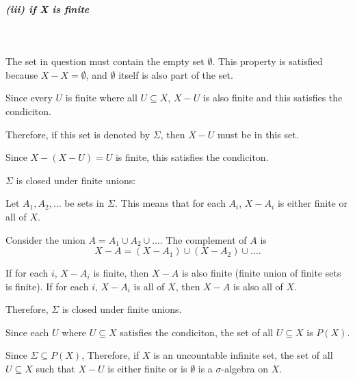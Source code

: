 \documentclass[12pt]{article}
\begin{document}
\subparagraph{(iii) if X is finite}
\ \\
\par \hspace*{1em}The set in question must contain the empty set \( \emptyset \). This property is satisfied because \( X - X = \emptyset \), and \( \emptyset \) itself is also part of the set. \\
\par \hspace*{1em}Since every \(U\) is finite where all \( U \subseteq X \), \(X-U\) is also finite and this satisfies the condiciton. \\
\par \hspace*{1em}Therefore, if this set is denoted by \( \Sigma \), then \( X-U \) must be in this set. \\
\par \hspace*{1em}Since \( X - (X-U) = U\) is finite, this satisfies the condiciton. \\

\par \hspace*{1em}$\Sigma$ is closed under finite unions:

\par \hspace*{1em}Let $A_1, A_2, \ldots$ be sets in $\Sigma$. This means that for each $A_i$, $X - A_i$ is either finite or all of $X$.

\par \hspace*{1em}Consider the union $A = A_1 \cup A_2 \cup \ldots$. The complement of $A$ is
\[
X - A = (X - A_1) \cup (X - A_2) \cup \ldots.
\]

\par \hspace*{1em}If for each $i$, $X - A_i$ is finite, then $X - A$ is also finite (finite union of finite sets is finite). If for each $i$, $X - A_i$ is all of $X$, then $X - A$ is also all of $X$. \\

\par \hspace*{1em}Therefore, $\Sigma$ is closed under finite unions.

\par \hspace*{1em}Since each \( U \) where \( U \subseteq X \) satisfies the condiciton, the set of all \( U \subseteq X \) is \( P(X) \). \\                                                                                           
\par \hspace*{1em}Since \( \Sigma \subseteq P(X) \), Therefore, if \( X \) is an uncountable infinite set, the set of all \( U \subseteq X \) such that \( X - U \) is either finite or is \(\emptyset\) is a \( \sigma \)-algebra on \( X \).
\end{document}
